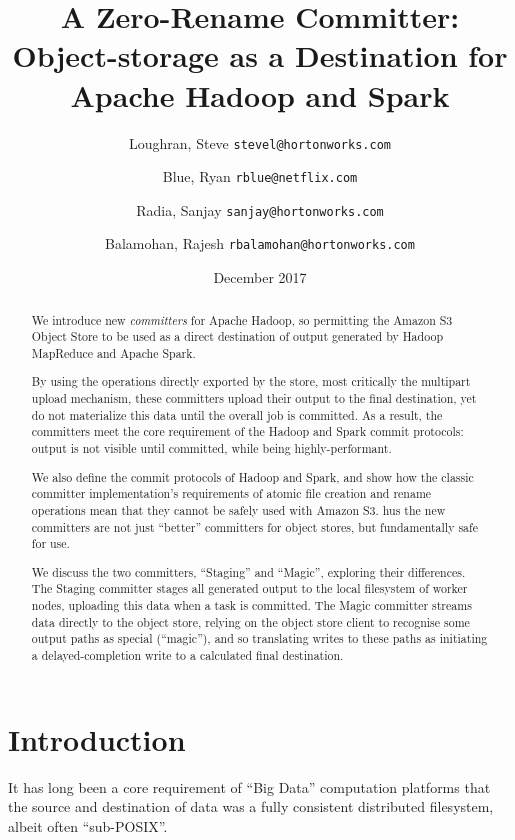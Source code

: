 \documentclass[conference]{IEEEtran}
\title{
A Zero-Rename Committer:\\
Object-storage as a Destination for Apache Hadoop and Spark}
\author{
  Loughran, Steve
  \texttt{stevel@hortonworks.com}\\
\and
  Blue, Ryan
  \texttt{rblue@netflix.com}\\
\and
  Radia, Sanjay
  \texttt{sanjay@hortonworks.com} \\
\and
  Balamohan, Rajesh
  \texttt{rbalamohan@hortonworks.com} \\
}
\date{December 2017}
\begin{document}
\maketitle


\begin{abstract}

We introduce new \emph{committers} for Apache Hadoop, so permitting
the Amazon S3 Object Store to be used as a direct destination of output generated
by Hadoop MapReduce and Apache Spark.

By using the operations directly exported by
the store, most critically the multipart upload mechanism, these committers upload
their output to the final destination, yet do not materialize this data until the
overall job is committed.
As a result, the committers meet the core requirement of the Hadoop and Spark commit
protocols: output is not visible until committed, while being highly-performant.

We also define the commit protocols of Hadoop and Spark, and show how the classic committer
implementation's requirements of atomic file creation and rename operations mean that they
cannot be safely used with Amazon S3.
hus the new committers are not just ``better'' committers for object stores,
but fundamentally safe for use.

We discuss the two committers, ``Staging'' and ``Magic'', exploring their differences.
The Staging committer stages all generated output to the local filesystem of
worker nodes, uploading this data when a task is committed.
The Magic committer streams data directly to the object store, relying on the
object store client to recognise some output paths as special (``magic''), and
so translating writes to these paths as initiating a delayed-completion write
to a calculated final destination.

\end{abstract}


\section{Introduction}
\label{sec:introduction}

It has long been a core requirement of ``Big Data'' computation platforms that
the source and destination of data was a fully consistent distributed filesystem,
albeit often ``sub-POSIX''.
\end{document}
